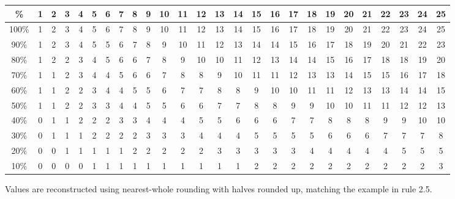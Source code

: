 \begin{landscape}

\begin{center}
\scriptsize
\setlength{\tabcolsep}{3.2pt}
\begin{tabular}{c*{25}{c}}
\toprule
\textbf{\%} & \textbf{1} & \textbf{2} & \textbf{3} & \textbf{4} & \textbf{5} & \textbf{6} & \textbf{7} & \textbf{8} & \textbf{9} & \textbf{10} & \textbf{11} & \textbf{12} & \textbf{13} & \textbf{14} & \textbf{15} & \textbf{16} & \textbf{17} & \textbf{18} & \textbf{19} & \textbf{20} & \textbf{21} & \textbf{22} & \textbf{23} & \textbf{24} & \textbf{25} \\
\midrule
100\% & 1 & 2 & 3 & 4 & 5 & 6 & 7 & 8 & 9 & 10 & 11 & 12 & 13 & 14 & 15 & 16 & 17 & 18 & 19 & 20 & 21 & 22 & 23 & 24 & 25 \\
90\% & 1 & 2 & 3 & 4 & 5 & 5 & 6 & 7 & 8 & 9 & 10 & 11 & 12 & 13 & 14 & 14 & 15 & 16 & 17 & 18 & 19 & 20 & 21 & 22 & 23 \\
80\% & 1 & 2 & 2 & 3 & 4 & 5 & 6 & 6 & 7 & 8 & 9 & 10 & 10 & 11 & 12 & 13 & 14 & 14 & 15 & 16 & 17 & 18 & 18 & 19 & 20 \\
70\% & 1 & 1 & 2 & 3 & 4 & 4 & 5 & 6 & 6 & 7 & 8 & 8 & 9 & 10 & 11 & 11 & 12 & 13 & 13 & 14 & 15 & 15 & 16 & 17 & 18 \\
60\% & 1 & 1 & 2 & 2 & 3 & 4 & 4 & 5 & 5 & 6 & 7 & 7 & 8 & 8 & 9 & 10 & 10 & 11 & 11 & 12 & 13 & 13 & 14 & 14 & 15 \\
50\% & 1 & 1 & 2 & 2 & 3 & 3 & 4 & 4 & 5 & 5 & 6 & 6 & 7 & 7 & 8 & 8 & 9 & 9 & 10 & 10 & 11 & 11 & 12 & 12 & 13 \\
40\% & 0 & 1 & 1 & 2 & 2 & 2 & 3 & 3 & 4 & 4 & 4 & 5 & 5 & 6 & 6 & 6 & 7 & 7 & 8 & 8 & 8 & 9 & 9 & 10 & 10 \\
30\% & 0 & 1 & 1 & 1 & 2 & 2 & 2 & 2 & 3 & 3 & 3 & 4 & 4 & 4 & 5 & 5 & 5 & 5 & 6 & 6 & 6 & 7 & 7 & 7 & 8 \\
20\% & 0 & 0 & 1 & 1 & 1 & 1 & 1 & 2 & 2 & 2 & 2 & 2 & 3 & 3 & 3 & 3 & 3 & 4 & 4 & 4 & 4 & 4 & 5 & 5 & 5 \\
10\% & 0 & 0 & 0 & 0 & 1 & 1 & 1 & 1 & 1 & 1 & 1 & 1 & 1 & 1 & 2 & 2 & 2 & 2 & 2 & 2 & 2 & 2 & 2 & 2 & 3 \\
\bottomrule
\end{tabular}
\end{center}

Values are reconstructed using nearest-whole rounding with halves rounded up, matching the example in rule 2.5.
\end{landscape}
